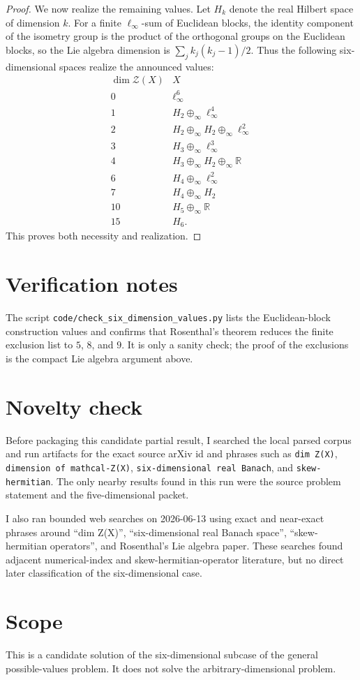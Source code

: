 \documentclass[11pt]{article}
\begin{document}
\begin{proof}
\smallskip
We now realize the remaining values. Let $H_k$ denote the real Hilbert space
of dimension $k$. For a finite $\ell_\infty$-sum of Euclidean blocks, the
identity component of the isometry group is the product of the orthogonal
groups on the Euclidean blocks, so the Lie algebra dimension is
$\sum_j k_j(k_j-1)/2$. Thus the following six-dimensional spaces realize the
announced values:
\[
\begin{array}{c|c}
\dim\mathcal Z(X) & X\\ \hline
0 & \ell_\infty^6\\
1 & H_2\oplus_\infty \ell_\infty^4\\
2 & H_2\oplus_\infty H_2\oplus_\infty \ell_\infty^2\\
3 & H_3\oplus_\infty \ell_\infty^3\\
4 & H_3\oplus_\infty H_2\oplus_\infty \mathbb R\\
6 & H_4\oplus_\infty \ell_\infty^2\\
7 & H_4\oplus_\infty H_2\\
10 & H_5\oplus_\infty \mathbb R\\
15 & H_6.
\end{array}
\]
This proves both necessity and realization.
\end{proof}

\section*{Verification notes}

The script \texttt{code/check\_six\_dimension\_values.py} lists the
Euclidean-block construction values and confirms that Rosenthal's theorem
reduces the finite exclusion list to $5$, $8$, and $9$. It is only a sanity
check; the proof of the exclusions is the compact Lie algebra argument above.

\section*{Novelty check}

Before packaging this candidate partial result, I searched the local parsed
corpus and run artifacts for the exact source arXiv id and phrases such as
\texttt{dim Z(X)}, \texttt{dimension of mathcal-Z(X)},
\texttt{six-dimensional real Banach}, and \texttt{skew-hermitian}. The only
nearby results found in this run were the source problem statement and the
five-dimensional packet.

I also ran bounded web searches on 2026-06-13 using exact and near-exact
phrases around ``dim Z(X)'', ``six-dimensional real Banach space'',
``skew-hermitian operators'', and Rosenthal's Lie algebra paper. These searches
found adjacent numerical-index and skew-hermitian-operator literature, but no
direct later classification of the six-dimensional case.

\section*{Scope}

This is a candidate solution of the six-dimensional subcase of the general
possible-values problem. It does not solve the arbitrary-dimensional problem.
\end{document}
